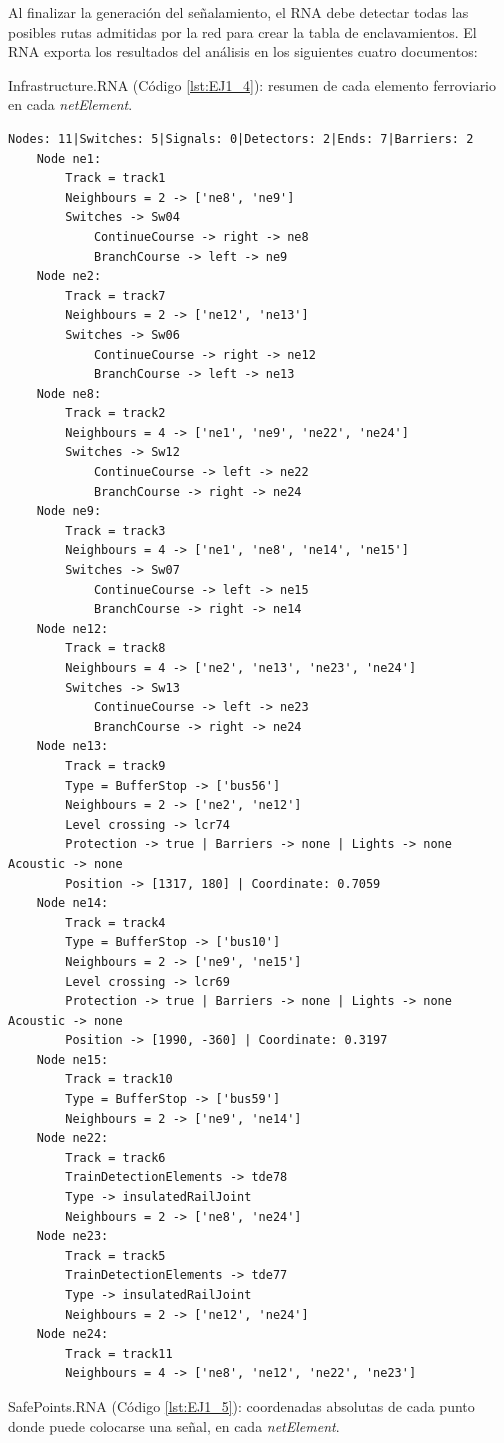 	Al finalizar la generación del señalamiento, el RNA debe detectar todas las posibles rutas admitidas por la red para crear la tabla de enclavamientos. El RNA exporta los resultados del análisis en los siguientes cuatro documentos:
	
	Infrastructure.RNA (Código \ref{lst:EJ1_4}): resumen de cada elemento ferroviario en cada \textit{netElement}.
	
	\begin{lstlisting}[language = {}, caption = Infrastructure.RNA, label = {lst:EJ1_4}]
	Nodes: 11|Switches: 5|Signals: 0|Detectors: 2|Ends: 7|Barriers: 2
	Node ne1:
		Track = track1
		Neighbours = 2 -> ['ne8', 'ne9']
		Switches -> Sw04
			ContinueCourse -> right -> ne8
			BranchCourse -> left -> ne9
	Node ne2:
		Track = track7
		Neighbours = 2 -> ['ne12', 'ne13']
		Switches -> Sw06
			ContinueCourse -> right -> ne12
			BranchCourse -> left -> ne13
	Node ne8:
		Track = track2
		Neighbours = 4 -> ['ne1', 'ne9', 'ne22', 'ne24']
		Switches -> Sw12
			ContinueCourse -> left -> ne22
			BranchCourse -> right -> ne24
	Node ne9:
		Track = track3
		Neighbours = 4 -> ['ne1', 'ne8', 'ne14', 'ne15']
		Switches -> Sw07
			ContinueCourse -> left -> ne15
			BranchCourse -> right -> ne14
	Node ne12:
		Track = track8
		Neighbours = 4 -> ['ne2', 'ne13', 'ne23', 'ne24']
		Switches -> Sw13
			ContinueCourse -> left -> ne23
			BranchCourse -> right -> ne24
	Node ne13:
		Track = track9
		Type = BufferStop -> ['bus56']
		Neighbours = 2 -> ['ne2', 'ne12']
		Level crossing -> lcr74
		Protection -> true | Barriers -> none | Lights -> none Acoustic -> none
		Position -> [1317, 180] | Coordinate: 0.7059
	Node ne14:
		Track = track4
		Type = BufferStop -> ['bus10']
		Neighbours = 2 -> ['ne9', 'ne15']
		Level crossing -> lcr69
		Protection -> true | Barriers -> none | Lights -> none Acoustic -> none
		Position -> [1990, -360] | Coordinate: 0.3197
	Node ne15:
		Track = track10
		Type = BufferStop -> ['bus59']
		Neighbours = 2 -> ['ne9', 'ne14']
	Node ne22:
		Track = track6
		TrainDetectionElements -> tde78
		Type -> insulatedRailJoint
		Neighbours = 2 -> ['ne8', 'ne24']
	Node ne23:
		Track = track5
		TrainDetectionElements -> tde77
		Type -> insulatedRailJoint
		Neighbours = 2 -> ['ne12', 'ne24']
	Node ne24:
		Track = track11
		Neighbours = 4 -> ['ne8', 'ne12', 'ne22', 'ne23']
	\end{lstlisting}
	
	SafePoints.RNA (Código \ref{lst:EJ1_5}): coordenadas absolutas de cada punto donde puede colocarse una señal, en cada \textit{netElement}.
	

